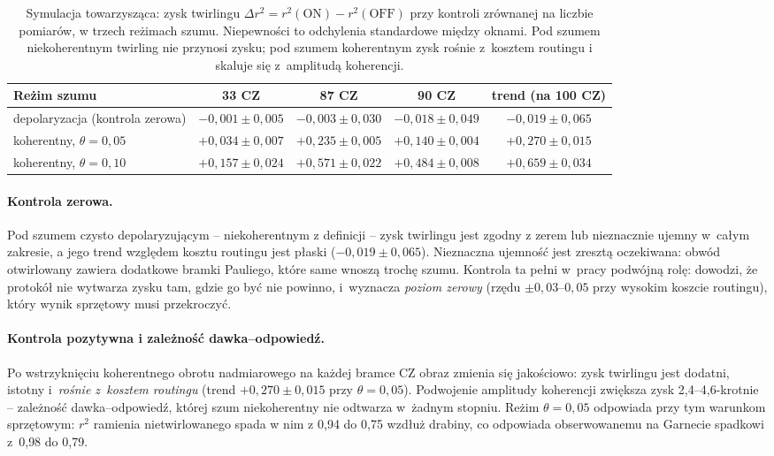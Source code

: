 \documentclass[11pt]{article}
\begin{document}
\begin{table}[!ht]\centering
\caption{Symulacja towarzysząca: zysk twirlingu $\Delta r^2 = r^2(\text{ON}) - r^2(\text{OFF})$ przy
kontroli zrównanej na liczbie pomiarów, w trzech reżimach szumu. Niepewności to odchylenia
standardowe między oknami. Pod szumem niekoherentnym twirling nie przynosi zysku; pod szumem
koherentnym zysk rośnie z~kosztem routingu i skaluje się z~amplitudą koherencji.}
\label{tab:mechanizm}
\small\begin{tabular}{lcccc}
\toprule
Reżim szumu & 33 CZ & 87 CZ & 90 CZ & trend (na 100 CZ) \\
\midrule
depolaryzacja (kontrola zerowa) & $-0{,}001 \pm 0{,}005$ & $-0{,}003 \pm 0{,}030$ & $-0{,}018 \pm 0{,}049$ & $-0{,}019 \pm 0{,}065$ \\
koherentny, $\theta=0{,}05$ & $+0{,}034 \pm 0{,}007$ & $+0{,}235 \pm 0{,}005$ & $+0{,}140 \pm 0{,}004$ & $+0{,}270 \pm 0{,}015$ \\
koherentny, $\theta=0{,}10$ & $+0{,}157 \pm 0{,}024$ & $+0{,}571 \pm 0{,}022$ & $+0{,}484 \pm 0{,}008$ & $+0{,}659 \pm 0{,}034$ \\
\bottomrule
\end{tabular}
\end{table}

\paragraph{Kontrola zerowa.} Pod szumem czysto depolaryzującym -- niekoherentnym z definicji --
zysk twirlingu jest zgodny z zerem lub nieznacznie ujemny w~całym zakresie, a jego trend względem
kosztu routingu jest płaski ($-0{,}019 \pm 0{,}065$). Nieznaczna ujemność jest zresztą oczekiwana:
obwód otwirlowany zawiera dodatkowe bramki Pauliego, które same wnoszą trochę szumu. Kontrola ta
pełni w~pracy podwójną rolę: dowodzi, że protokół nie wytwarza zysku tam, gdzie go być nie powinno,
i~wyznacza \emph{poziom zerowy} (rzędu $\pm 0{,}03$--$0{,}05$ przy wysokim koszcie routingu), który
wynik sprzętowy musi przekroczyć.

\paragraph{Kontrola pozytywna i zależność dawka--odpowiedź.} Po wstrzyknięciu koherentnego obrotu
nadmiarowego na każdej bramce CZ obraz zmienia się jakościowo: zysk twirlingu jest dodatni, istotny
i~\emph{rośnie z~kosztem routingu} (trend $+0{,}270 \pm 0{,}015$ przy $\theta=0{,}05$). Podwojenie
amplitudy koherencji zwiększa zysk 2{,}4--4{,}6-krotnie -- zależność dawka--odpowiedź, której szum
niekoherentny nie odtwarza w~żadnym stopniu. Reżim $\theta=0{,}05$ odpowiada przy tym warunkom
sprzętowym: $r^2$ ramienia nietwirlowanego spada w nim z 0{,}94 do 0{,}75 wzdłuż drabiny, co
odpowiada obserwowanemu na Garnecie spadkowi z~0{,}98 do 0{,}79.
\end{document}
